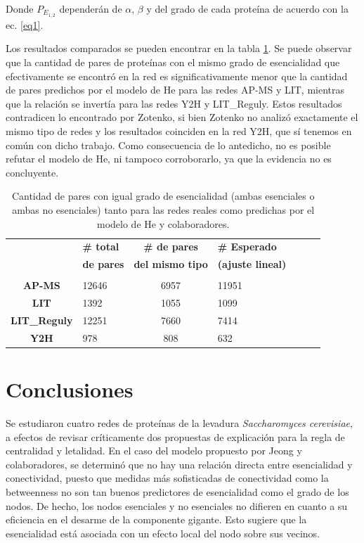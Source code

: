 \documentclass[%
 reprint,
 amsmath,amssymb,
 aps,
]{revtex4-1}
\def \sc {\em Saccharomyces cerevisiae}
\begin{document}
Donde $P_{E_{1,2}}$ depender\'an de $\alpha$, $\beta$ y del grado de cada prote\'ina de acuerdo con la ec. \ref{eq1}.

Los resultados comparados se pueden encontrar en la tabla \ref{tabla4}. Se puede observar que la cantidad de pares de prote\'inas con el mismo grado de esencialidad que efectivamente se encontr\'o en la red es significativamente menor que la cantidad de pares predichos por el modelo de He para las redes AP-MS y LIT, mientras que la relaci\'on se invert\'ia para las redes Y2H y LIT\_Reguly. Estos resultados contradicen lo encontrado por Zotenko, si bien Zotenko no analiz\'o exactamente el mismo tipo de redes y los resultados coinciden en la red Y2H, que s\'i tenemos en com\'un con dicho trabajo. Como consecuencia de lo antedicho, no es posible refutar el modelo de He, ni tampoco corroborarlo, ya que la evidencia no es concluyente. 

\begin{table}[h]
\begin{ruledtabular}
\begin{tabular}{ c l c l c l c }  
{}&{\bf          \# total }&{\bf  \# de pares }&{\bf \# Esperado }\\
{}&{\bf          de pares}&{\bf  del mismo tipo }&{\bf  (ajuste lineal)  }\\\hline\\
{\bf AP-MS        }&{           12646           }&{             6957 }&{  11951 }\\
{\bf LIT            }&{          1392          }&{              1055  }&{ 1099}\\
{\bf LIT\_Reguly      }&{        12251             }&{ 7660   }&{ 7414}  \\
{\bf Y2H}&{978 }&{808}&{632}\\

\end{tabular}
\end{ruledtabular}
\caption{Cantidad de pares con igual grado de esencialidad (ambas esenciales o ambas no esenciales) tanto para las redes reales como predichas por el modelo de He y colaboradores.}
\label{tabla4}
\end{table}

\section{Conclusiones}

Se estudiaron cuatro redes de prote\'inas de la levadura {\sc}, a efectos de revisar cr\'iticamente dos propuestas de explicaci\'on para la regla de centralidad y letalidad. En el caso del modelo propuesto por Jeong y colaboradores, se determin\'o que no hay una relaci\'on directa entre esencialidad y conectividad, puesto que medidas m\'as sofisticadas de conectividad como la betweenness no son tan buenos predictores de esencialidad como el grado de los nodos. De hecho, los nodos esenciales y no esenciales no difieren en cuanto a su eficiencia en el desarme de la componente gigante. Esto sugiere que la esencialidad est\'a asociada con un efecto local del nodo sobre sus vecinos. 
\end{document}
